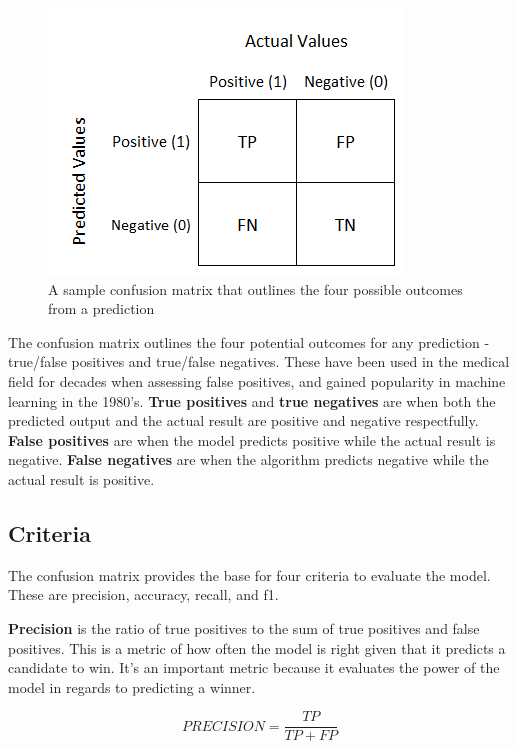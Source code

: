 \documentclass[11pt, twoside, reqno]{book}
\begin{document}
\begin{figure}[H]
\label{fig:confmatrix}
\centering
	\includegraphics[scale=0.5]{confusion_matrix}
	\caption{A sample confusion matrix that outlines the four possible outcomes from a prediction}\label{fig:confusion_matrix}
\end{figure}

The confusion matrix outlines the four potential outcomes for any prediction - true/false positives and true/false negatives. These have been used in the medical field for decades when assessing false positives, and gained popularity in machine learning in the 1980's\cite{fawcett}. \textbf{True positives} and \textbf{true negatives} are when both the predicted output and the actual result are positive and negative respectfully. \textbf{False positives} are when the model predicts positive while the actual result is negative. \textbf{False negatives} are when the algorithm predicts negative while the actual result is positive. 

\subsection{Criteria}
\label{subsec:criteria}
\hspace{0.2in} The confusion matrix provides the base for four criteria to evaluate the model. These are precision, accuracy, recall, and f1\cite{vader, fawcett}.

\textbf{Precision} is the ratio of true positives to the sum of true positives and false positives. This is a metric of how often the model is right given that it predicts a candidate to win. It's an important metric because it evaluates the power of the model in regards to predicting a winner. 

\begin{equation}
\label{eq:precision}
PRECISION = \dfrac{TP}{TP+FP}
\end{equation}
\end{document}
